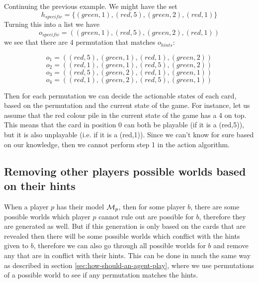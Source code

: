 Continuing the previous example. We might have the set \[h_{specific} = \{(green,1),(red,5),(green,2),(red,1)\}\]
Turning this into a list we have
\[o_{specific} = ((green,1),(red,5),(green,2),(red,1))\]
we see that there are 4 permutation that matches $o_{hints}$:

\[o_{1} = ((red,5),(green,1),(red,1),(green,2))\]
\[o_{2} = ((red,1),(green,1),(red,5),(green,2))\]
\[o_{3} = ((red,5),(green,2),(red,1),(green,1))\]
\[o_{4} = ((red,1),(green,2),(red,5),(green,1))\]

Then for each permutation we can decide the actionable states of each card, based on the permutation and the current state of the game. For instance, let us assume that the red colour pile in the current state of the game has a 4 on top. This means that the card in position 0 can both be playable (if it is a (red,5)), but it is also unplayable (i.e. if it is a (red,1)). Since we can't know for sure based on our knowledge, then we cannot perform step 1 in the action algorithm.


\subsection{Removing other players possible worlds based on their hints} \label{sec:design:removing-worlds-based-on-hints}
When a player $p$ has their model $\mathcal{M}_p$, then for some player $b$, there are some possible worlds which player $p$ cannot rule out are possible for $b$, therefore they are generated as well. But if this generation is only based on the cards that are revealed then there will be some possible worlds which conflict with the hints given to $b$, therefore we can also go through all possible worlds for $b$ and remove any that are in conflict with their hints. This can be done in much the same way as described in section \ref{sec:how-should-an-agent-play}, where we use permutations of a possible world to see if any permutation matches the hints.

